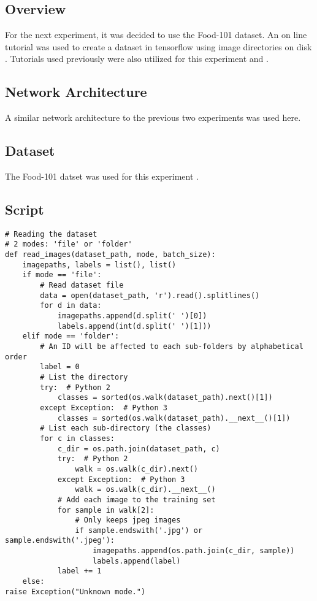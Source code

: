 \subsection*{Overview}
For the next experiment, it was decided to use the Food-101 dataset.
An on line tutorial was used to create a dataset in tensorflow using image directories on disk \textcite{file_dir_code}.
Tutorials used previously were also utilized for this experiment \textcite{udemy} and \textcite{cifar}.

\subsection*{Network Architecture}
A similar network architecture to the previous two experiments was used here.

\subsection*{Dataset}
The Food-101 datset was used for this experiment \textcite{food101}.

\subsection*{Script}
\begin{lstlisting}
# Reading the dataset
# 2 modes: 'file' or 'folder'
def read_images(dataset_path, mode, batch_size):
    imagepaths, labels = list(), list()
    if mode == 'file':
        # Read dataset file
        data = open(dataset_path, 'r').read().splitlines()
        for d in data:
            imagepaths.append(d.split(' ')[0])
            labels.append(int(d.split(' ')[1]))
    elif mode == 'folder':
        # An ID will be affected to each sub-folders by alphabetical order
        label = 0
        # List the directory
        try:  # Python 2
            classes = sorted(os.walk(dataset_path).next()[1])
        except Exception:  # Python 3
            classes = sorted(os.walk(dataset_path).__next__()[1])
        # List each sub-directory (the classes)
        for c in classes:
            c_dir = os.path.join(dataset_path, c)
            try:  # Python 2
                walk = os.walk(c_dir).next()
            except Exception:  # Python 3
                walk = os.walk(c_dir).__next__()
            # Add each image to the training set
            for sample in walk[2]:
                # Only keeps jpeg images
                if sample.endswith('.jpg') or sample.endswith('.jpeg'):
                    imagepaths.append(os.path.join(c_dir, sample))
                    labels.append(label)
            label += 1
    else:
raise Exception("Unknown mode.")
\end{lstlisting}


